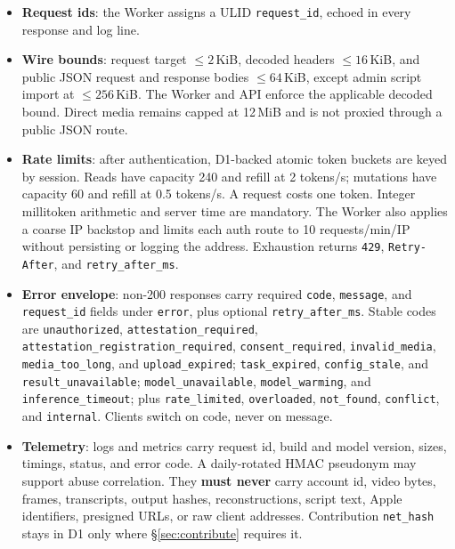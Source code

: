 \documentclass[11pt]{article}
\newcommand{\code}[1]{\texttt{#1}}
\begin{document}
\begin{itemize}[nosep]
  \item \textbf{Request ids}: the Worker assigns a ULID \code{request\_id}, echoed
        in every response and log line.
  \item \textbf{Wire bounds}: request target $\leq 2$\,KiB, decoded headers
        $\leq 16$\,KiB, and public JSON request and response bodies $\leq 64$\,KiB,
        except admin script import at $\leq 256$\,KiB. The Worker and API enforce
        the applicable decoded bound. Direct media remains capped at 12\,MiB and is
        not proxied through a public JSON route.
  \item \textbf{Rate limits}: after authentication, D1-backed atomic token buckets
        are keyed by session. Reads have capacity 240 and refill at 2 tokens/s;
        mutations have capacity 60 and refill at 0.5 tokens/s. A request costs one
        token. Integer millitoken arithmetic and server time are mandatory. The
        Worker also applies a coarse IP backstop and limits each auth route to
        10 requests/min/IP without persisting or logging the address. Exhaustion
        returns \code{429}, \code{Retry-After}, and \code{retry\_after\_ms}.
  \item \textbf{Error envelope}: non-200 responses carry required \code{code},
        \code{message}, and \code{request\_id} fields under \code{error}, plus
        optional \code{retry\_after\_ms}. Stable codes are
        \code{unauthorized}, \code{attestation\_required},
        \code{attestation\_registration\_required}, \code{consent\_required},
        \code{invalid\_media}, \code{media\_too\_long}, and
        \code{upload\_expired}; \code{task\_expired}, \code{config\_stale}, and
        \code{result\_unavailable}; \code{model\_unavailable},
        \code{model\_warming}, and \code{inference\_timeout}; plus
        \code{rate\_limited}, \code{overloaded}, \code{not\_found},
        \code{conflict}, and \code{internal}. Clients switch on code, never on
        message.
  \item \textbf{Telemetry}: logs and metrics carry request id, build and model
        version, sizes, timings, status, and error code. A daily-rotated HMAC
        pseudonym may support abuse correlation. They \textbf{must never} carry
        account id, video bytes, frames, transcripts, output hashes,
        reconstructions, script text, Apple identifiers, presigned URLs, or raw
        client addresses. Contribution \code{net\_hash} stays in D1 only where
        \S\ref{sec:contribute} requires it.

\end{itemize}
\end{document}
